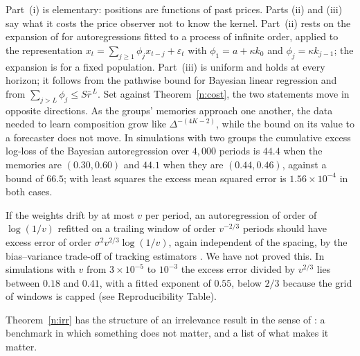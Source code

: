 Part~(i) is elementary: positions are functions of past prices. Parts (ii) and (iii) say what it costs the price observer not to know the kernel. Part~(ii) rests on the expansion of \citet{ingwei2003} for autoregressions fitted to a process of infinite order, applied to the representation $x_t=\sum_{j\ge1}\phi_jx_{t-j}+\varepsilon_t$ with $\phi_1=a+\kappa k_0$ and $\phi_j=\kappa k_{j-1}$; the expansion is for a fixed population. Part~(iii) is uniform and holds at every horizon; it follows from the pathwise bound for Bayesian linear regression \citep{vovk2001} and from $\sum_{j>L}\phi_j\le S\bar r^{\,L}$. Set against Theorem~\ref{n:cost}, the two statements move in opposite directions. As the groups' memories approach one another, the data needed to learn composition grow like $\Delta^{-(4K-2)}$, while the bound on its value to a forecaster does not move. In simulations with two groups the cumulative excess log-loss of the Bayesian autoregression over $4{,}000$ periods is $44.4$ when the memories are $(0.30,0.60)$ and $44.1$ when they are $(0.44,0.46)$, against a bound of $66.5$; with least squares the excess mean squared error is $1.56\times10^{-4}$ in both cases.

\begin{remark}
If the weights drift by at most $v$ per period, an autoregression of order of $\log(1/v)$ refitted on a trailing window of order $v^{-2/3}$ periods should have excess error of order $\sigma^2v^{2/3}\log(1/v)$, again independent of the spacing, by the bias--variance trade-off of tracking estimators \citep{guoljung1995}. We have not proved this. In simulations with $v$ from $3\times10^{-5}$ to $10^{-3}$ the excess error divided by $v^{2/3}$ lies between $0.18$ and $0.41$, with a fitted exponent of $0.55$, below $2/3$ because the grid of windows is capped (see Reproducibility Table).
\end{remark}

Theorem~\ref{n:irr} has the structure of an irrelevance result in the sense of \citet{mm1958}: a benchmark in which something does not matter, and a list of what makes it matter.


